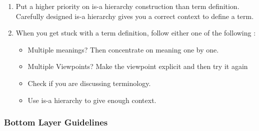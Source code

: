 \begin{enumerate}
\item Put a higher priority on is-a hierarchy construction than term definition. Carefully designed is-a hierarchy gives you a correct context to define a term.

\item When you get stuck with a term definition, follow either one of the following : 
\begin{itemize}
\item Multiple meanings? Then concentrate on meaning one by one. 
\item Multiple Viewpoints? Make the viewpoint explicit and then try it again 
\item Check if you are discussing terminology.
\item Use is-a hierarchy to give enough context. 
\end{itemize}
\end{enumerate}

\subsubsection*{Bottom Layer Guidelines}
\label{subsubsec:bottom-layer}

